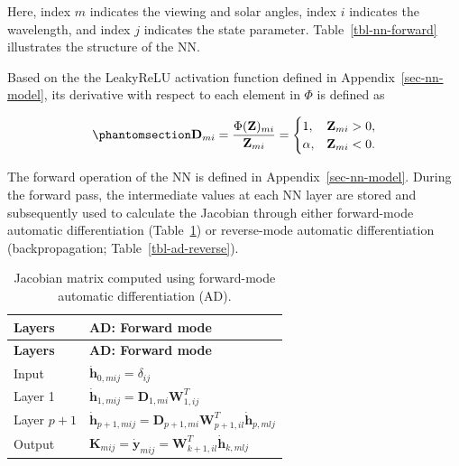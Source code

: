 \documentclass[
  11pt,
  letterpaper,
]{scrreprt}
\begin{document}
Here, index \(m\) indicates the viewing and solar angles, index \(i\)
indicates the wavelength, and index \(j\) indicates the state parameter.
Table~\ref{tbl-nn-forward} illustrates the structure of the NN.

Based on the the LeakyReLU activation function defined in
Appendix~\ref{sec-nn-model}, its derivative with respect to each element
in \(\Phi\) is defined as

\begin{equation}\phantomsection\label{eq-D}{
\mathbf{D}_{mi}
=
\frac{\Phi(\mathbf{Z})_{mi}}
{\mathbf{Z}_{mi}}
=
\begin{cases}
1, & \mathbf{Z}_{mi}>0, \\
\alpha, & \mathbf{Z}_{mi}<0.
\end{cases}
}\end{equation}

The forward operation of the NN is defined in
Appendix~\ref{sec-nn-model}. During the forward pass, the intermediate
values at each NN layer are stored and subsequently used to calculate
the Jacobian through either forward-mode automatic differentiation
(Table~\ref{tbl-ad-forward}) or reverse-mode automatic differentiation
(backpropagation; Table~\ref{tbl-ad-reverse}).

\begin{longtable}[]{@{}
  >{\raggedright\arraybackslash}p{}
  >{\raggedright\arraybackslash}p{}@{}}
\caption{Jacobian matrix computed using forward-mode automatic
differentiation (AD).}\label{tbl-ad-forward}\tabularnewline
\toprule\noalign{}
\begin{minipage}[b]{\linewidth}\raggedright
\textbf{Layers}
\end{minipage} & \begin{minipage}[b]{\linewidth}\raggedright
\textbf{AD: Forward mode}
\end{minipage} \\
\midrule\noalign{}
\endfirsthead
\toprule\noalign{}
\begin{minipage}[b]{\linewidth}\raggedright
\textbf{Layers}
\end{minipage} & \begin{minipage}[b]{\linewidth}\raggedright
\textbf{AD: Forward mode}
\end{minipage} \\
\midrule\noalign{}
\endhead
\bottomrule\noalign{}
\endlastfoot
Input & \(\dot{\mathbf{h}}_{0,mij}=\delta_{ij}\) \\
Layer 1 &
\(\dot{\mathbf{h}}_{1,mij}=\mathbf{D}_{1,mi}\mathbf{W}_{1,ij}^T\) \\
Layer \(p+1\) &
\(\dot{\mathbf{h}}_{p+1,mij}=\mathbf{D}_{p+1,mi}\mathbf{W}_{p+1,il}^T\dot{\mathbf{h}}_{p,mlj}\) \\
Output &
\(\mathbf{K}_{mij}=\dot{\mathbf{y}}_{mij}=\mathbf{W}_{k+1,il}^T\dot{\mathbf{h}}_{k,mlj}\) \\
\end{longtable}
\end{document}
